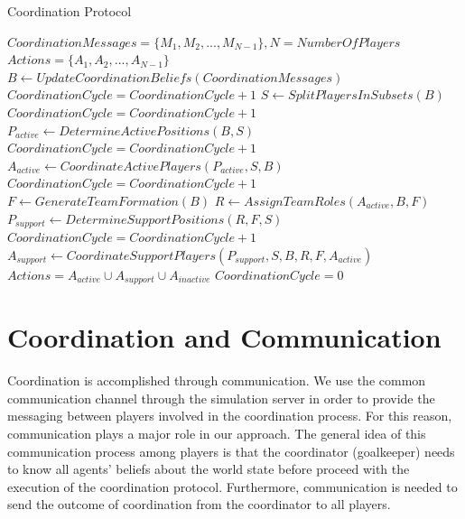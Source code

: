 \begin{algorithm}[ht!]
\caption{Coordination Protocol }
\label{CoordinationAlgorithm}
\begin{algorithmic}[1]
\begin{small}
$Coordination Messages = \lbrace M_{1},M_{2},...,M_{N-1} \rbrace, N = Number Of Players $
$Actions = \lbrace A_{1},A_{2},...,A_{N-1} \rbrace$
\STATE
{}
\STATE $B \leftarrow Update Coordination Beliefs(Coordination Messages) $
\STATE $CoordinationCycle = CoordinationCycle + 1$
\STATE $S \leftarrow Split Players In Subsets(B) $
\STATE $CoordinationCycle = CoordinationCycle + 1$
\STATE $P_{active} \leftarrow Determine Active Positions(B,S) $
\STATE $CoordinationCycle = CoordinationCycle + 1$
\STATE $A_{active} \leftarrow Coordinate Active Players(P_{active},S,B) $
\STATE $CoordinationCycle = CoordinationCycle + 1$
\STATE $ F \leftarrow Generate Team Formation(B) $
\STATE $ R \leftarrow Assign Team Roles(A_{active},B,F) $
\STATE $ P_{support} \leftarrow Determine Support Positions(R,F,S) $
\STATE $CoordinationCycle = CoordinationCycle + 1$
\STATE $A_{support} \leftarrow Coordinate Support Players(P_{support},S,B,R,F,A_{active}) $
\STATE $Actions = A_{active} \cup A_{support} \cup A_{inactive}$
\STATE $CoordinationCycle = 0$
\ENDIF
\end{small}
\end{algorithmic}
\end{algorithm}


\section{Coordination and Communication}
Coordination is accomplished through communication. We use the common communication channel through the simulation server in order to provide the messaging between players involved in the coordination process. For this reason, communication plays a major role in our approach. The general idea of this communication process among players is that the coordinator (goalkeeper) needs to know all agents' beliefs about the world state before proceed with the execution of the coordination protocol. Furthermore, communication is needed to send the outcome of coordination from the coordinator to all players. 

